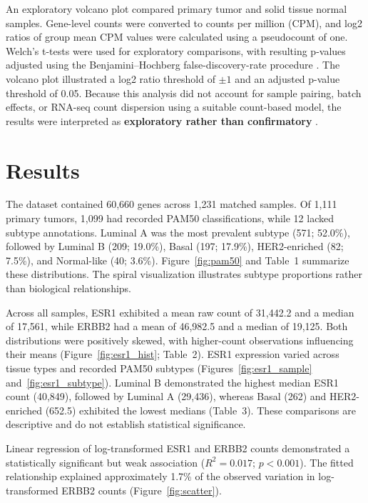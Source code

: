 \documentclass[12pt,letterpaper]{article}
\begin{document}
An exploratory volcano plot compared primary tumor and solid tissue normal samples. Gene-level counts were converted to counts per million (CPM), and log2 ratios of group mean CPM values were calculated using a pseudocount of one. Welch's t-tests were used for exploratory comparisons, with resulting p-values adjusted using the Benjamini--Hochberg false-discovery-rate procedure \parencite{benjamini1995}. The volcano plot illustrated a log2 ratio threshold of $\pm 1$ and an adjusted p-value threshold of 0.05. Because this analysis did not account for sample pairing, batch effects, or RNA-seq count dispersion using a suitable count-based model, the results were interpreted as \textbf{exploratory rather than confirmatory} \parencite{love2014}.





\section*{Results}

The dataset contained 60,660 genes across 1,231 matched samples. Of 1,111 primary tumors, 1,099 had recorded PAM50 classifications, while 12 lacked subtype annotations. Luminal A was the most prevalent subtype (571; 52.0\%), followed by Luminal B (209; 19.0\%), Basal (197; 17.9\%), HER2-enriched (82; 7.5\%), and Normal-like (40; 3.6\%). Figure~\ref{fig:pam50} and Table~1 summarize these distributions. The spiral visualization illustrates subtype proportions rather than biological relationships.

Across all samples, ESR1 exhibited a mean raw count of 31,442.2 and a median of 17,561, while ERBB2 had a mean of 46,982.5 and a median of 19,125. Both distributions were positively skewed, with higher-count observations influencing their means (Figure~\ref{fig:esr1_hist}; Table~2). ESR1 expression varied across tissue types and recorded PAM50 subtypes (Figures~\ref{fig:esr1_sample} and~\ref{fig:esr1_subtype}). Luminal B demonstrated the highest median ESR1 count (40,849), followed by Luminal A (29,436), whereas Basal (262) and HER2-enriched (652.5) exhibited the lowest medians (Table~3). These comparisons are descriptive and do not establish statistical significance.

Linear regression of log-transformed ESR1 and ERBB2 counts demonstrated a statistically significant but weak association ($R^2 = 0.017$; $p < 0.001$). The fitted relationship explained approximately 1.7\% of the observed variation in log-transformed ERBB2 counts (Figure~\ref{fig:scatter}).
\end{document}

